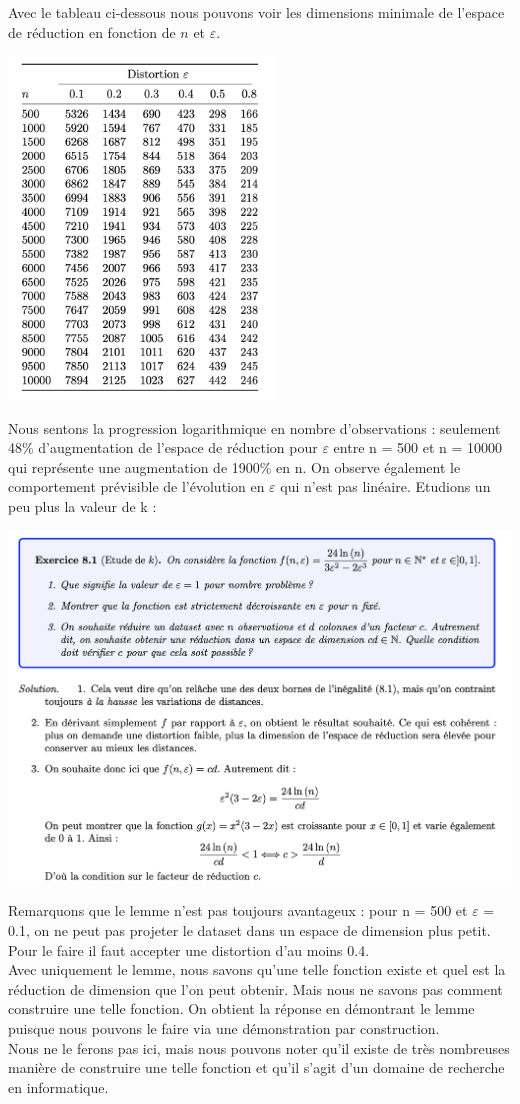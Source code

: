 Avec le tableau ci-dessous nous pouvons voir les dimensions minimale de l’espace de réduction en fonction de $n$ et $\varepsilon$.


\includegraphics[width=200pt]{./img/reduction_dim/lemme_jl/table}


Nous sentons la progression logarithmique en nombre d’observations : seulement 48\% d’augmentation de l’espace de réduction pour $\varepsilon$ entre n = 500 et n = 10000 qui représente une augmentation de 1900\% en n.
On observe également le comportement prévisible de l’évolution en $\varepsilon$ qui n’est pas linéaire. Etudions un peu plus la valeur de k :


\includegraphics[width=\linewidth]{./img/reduction_dim/lemme_jl/exercice_jl}


Remarquons que le lemme n’est pas toujours avantageux : pour n = 500 et $\varepsilon$ = 0.1, on ne peut pas projeter le dataset dans un espace de dimension plus petit. Pour le faire il faut accepter une distortion d’au moins 0.4.
\\
Avec uniquement le lemme, nous savons qu’une telle fonction existe et quel est la réduction de dimension que l’on peut obtenir. Mais nous ne savons pas comment construire une telle fonction. On obtient la réponse en démontrant le lemme puisque nous pouvons le faire via une démonstration par construction. 
\\
Nous ne le ferons pas ici, mais nous pouvons noter qu’il existe de très nombreuses manière de construire une telle fonction et qu’il s’agit d’un domaine de recherche en informatique.


